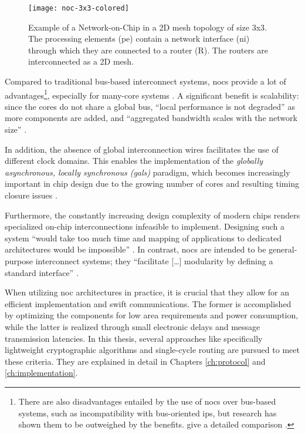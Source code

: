 \begin{figure}
    \centering
    \texttt{[image: noc-3x3-colored]}
    \caption[Example of a 3x3 mesh NoC]{Example of a Network-on-Chip in a 2D mesh topology of size 3x3. The processing elements (\gls{pe}) contain a network interface
    (\gls{ni}) through which they are connected to a router (R). The routers are interconnected as a 2D mesh.}
    \label{fig:nocexample}
\end{figure}

Compared to traditional bus-based interconnect systems, \glspl{noc} provide a lot of advantages\footnote{There are also disadvantages entailed by
the use of \glspl{noc} over bus-based systems, such as incompatibility with bus-oriented \glspl{ip}, but research has shown them to be outweighed
by the benefits. \citeauthor{tatas16designingnocs} give a detailed comparison \cite[6]{tatas16designingnocs}.}, especially for many-core systems
\cite[5\psqq]{tatas16designingnocs}. A significant benefit is scalability: since the cores do not share a global bus, \enquote{local performance is not
degraded} \cite[6]{tatas16designingnocs} as more components are added, and \enquote{aggregated bandwidth scales with the network size}
\cite[6]{tatas16designingnocs}.

In addition, the absence of global interconnection wires facilitates the use of different clock domains. This enables the implementation of the
\textit{globally asynchronous, locally synchronous (\gls{gals})} paradigm, which becomes increasingly important in chip design due to the growing
number of cores and resulting timing closure issues \cites[3]{kumar02networkonchip}[2]{ivanov05nocintroduction}.

Furthermore, the constantly increasing design complexity of modern chips \cite{mack11mooreslaw} renders specialized on-chip
interconnections infeasible to implement. Designing such a system \enquote{would take too much time and mapping of applications to dedicated
architectures would be impossible} \cite[1]{kumar02networkonchip}. In contrast, \glspl{noc} are intended to be general-purpose interconnect systems; they
\enquote{facilitate […] modularity by defining a standard interface} \cite[1]{dally01routepacketsnotwires}.

When utilizing \gls{noc} architectures in practice, it is crucial that they allow for an efficient implementation and swift communications. The
former is accomplished by optimizing the components for low area requirements and power consumption, while the latter is realized
through small electronic delays and message transmission latencies. In this thesis, several approaches like specifically lightweight cryptographic
algorithms and single-cycle routing are pursued to meet these criteria. They are explained in detail in Chapters \ref{ch:protocol} and
\ref{ch:implementation}.

